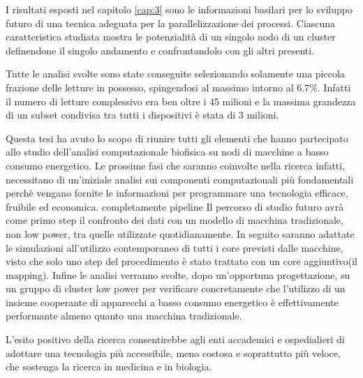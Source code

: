 I risultati esposti nel capitolo \ref{cap:3} sono le informazioni basilari per lo sviluppo futuro di una tecnica adeguata per la parallelizzazione dei processi.
Ciascuna caratteristica studiata mostra le potenzialità di un singolo nodo di un cluster definendone il singolo andamento e confrontandolo con gli altri presenti.

Tutte le analisi svolte sono state conseguite selezionando solamente una piccola frazione delle letture in possesso, spingendosi al massimo intorno al $6.7\%$. 
Infatti il numero di letture complessivo era ben oltre i 45 milioni e la massima grandezza di un subset condivisa tra tutti i dispositivi è stata di 3 milioni.

Questa tesi ha avuto lo scopo di riunire tutti gli elementi che hanno partecipato allo studio dell'analisi computazionale biofisica su nodi di macchine a basso consumo energetico.  
Le prossime fasi che saranno coinvolte nella ricerca infatti, necessitano di un'iniziale analisi sui componenti computazionali più fondamentali perchè vengano fornite le informazioni per programmare una tecnologia efficace, fruibile ed economica.
completamente pipeline
Il percorso di studio futuro avrà come primo step il confronto dei dati con un modello di macchina tradizionale, non low power, tra quelle utilizzate quotidianamente.
In seguito saranno adattate le simulazioni all'utilizzo contemporaneo di tutti i core previsti dalle macchine, visto che solo uno step del procedimento è stato trattato con un core aggiuntivo(il mapping).
Infine le analisi verranno svolte, dopo un'opportuna progettazione, su un gruppo di cluster low power per verificare concretamente che l'utilizzo di un insieme cooperante di apparecchi a basso consumo energetico è effettivamente performante almeno quanto una macchina tradizionale.

L'esito positivo della ricerca consentirebbe agli enti accademici e ospedialieri di adottare una tecnologia più accessibile, meno costosa e soprattutto più veloce, che sostenga la ricerca in medicina e in biologia.


